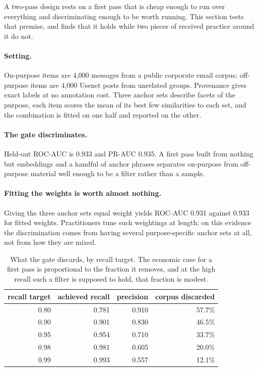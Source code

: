 A two-pass design rests on a first pass that is cheap enough to run over
everything and discriminating enough to be worth running. This section tests that
premise, and finds that it holds while two pieces of received practice around it
do not.

\paragraph{Setting.}
On-purpose items are 4,000 messages from a public corporate email corpus;
off-purpose items are 4,000 Usenet posts from unrelated groups. Provenance gives
exact labels at no annotation cost. Three anchor sets describe facets of the
purpose, each item scores the mean of its best few similarities to each set, and
the combination is fitted on one half and reported on the other.

\paragraph{The gate discriminates.}
Held-out ROC-AUC is 0.933 and PR-AUC 0.935. A first pass built from nothing but
embeddings and a handful of anchor phrases separates on-purpose from off-purpose
material well enough to be a filter rather than a sample.

\paragraph{Fitting the weights is worth almost nothing.}
Giving the three anchor sets equal weight yields ROC-AUC 0.931 against 0.933 for
fitted weights. Practitioners tune such weightings at length; on this evidence
the discrimination comes from having several purpose-specific anchor sets at all,
not from how they are mixed.

\begin{table}[t]
\caption{What the gate discards, by recall target. The economic case for a first
pass is proportional to the fraction it removes, and at the high recall such a
filter is supposed to hold, that fraction is modest.}
\label{tab:gate}
\centering
\begin{tabular}{rrrr}
\toprule
recall target & achieved recall & precision & corpus discarded \\
\midrule
0.80 & 0.781 & 0.910 & 57.7\% \\
0.90 & 0.901 & 0.830 & 46.5\% \\
0.95 & 0.954 & 0.710 & 33.7\% \\
0.98 & 0.981 & 0.605 & 20.0\% \\
0.99 & 0.993 & 0.557 & 12.1\% \\
\bottomrule
\end{tabular}
\end{table}

